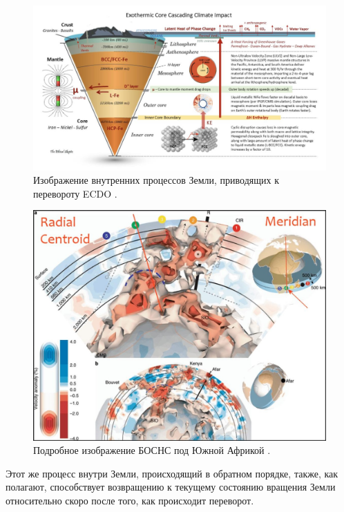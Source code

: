 \documentclass[10pt,twocolumn,letterpaper]{article}
\begin{document}
\begin{figure}[t]
\begin{center}
\includegraphics[width=1\textwidth]{layers.jpg}
\end{center}
   \caption{Изображение внутренних процессов Земли, приводящих к перевороту ECDO \cite{129}.}
\label{fig:11}
\end{figure}
\begin{figure}[t]
\begin{center}
   \includegraphics[width=1\linewidth]{llvp.jpg}
\end{center}
   \caption{Подробное изображение БОСНС под Южной Африкой \cite{28}.}
\label{fig:12}
\label{fig:onecol}
\end{figure}

Этот же процесс внутри Земли, происходящий в обратном порядке, также, как полагают, способствует возвращению к текущему состоянию вращения Земли относительно скоро после того, как происходит переворот.
\end{document}
